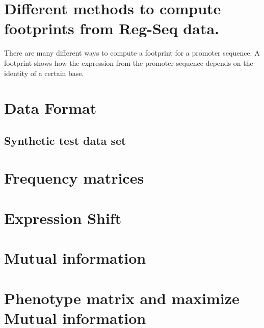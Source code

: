 \documentclass{article}
\begin{document}
\section*{Different methods to compute footprints from Reg-Seq data.}
There are many different ways to compute a footprint for a promoter sequence. A footprint shows how the expression from the promoter sequence depends on the identity of a certain base.
\section*{Data Format}
\subsection*{Synthetic test data set}
\section*{Frequency matrices}

\section*{Expression Shift}

\section*{Mutual information}

\section*{Phenotype matrix and maximize Mutual information}
\end{document}
